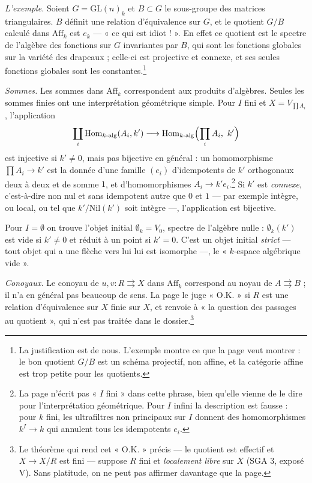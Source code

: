 \documentclass[11pt,a4paper]{article}
\begin{document}
\emph{L'exemple.} Soient $G = \mathrm{GL}(n)_k$ et $B \subset G$ le sous-groupe
des matrices triangulaires. $B$ définit une relation d'équivalence sur $G$, et
le quotient $G/B$ calculé dans $\mathrm{Aff}_k$ est $e_k$ --- « ce qui est
idiot ! ». En effet ce quotient est le spectre de l'algèbre des fonctions sur
$G$ invariantes par $B$, qui sont les fonctions globales sur la variété des
drapeaux ; celle-ci est projective et connexe, et ses seules fonctions globales
sont les constantes.\footnote{La justification est de nous. L'exemple montre ce
que la page veut montrer : le bon quotient $G/B$ est un schéma projectif, non
affine, et la catégorie affine est trop petite pour les quotients.}

\emph{Sommes.} Les sommes dans $\mathrm{Aff}_k$ correspondent aux produits
d'algèbres. Seules les sommes finies ont une interprétation géométrique
simple. Pour $I$ fini et $X = V_{\prod A_i}$, l'application
\[
\coprod_i \operatorname{Hom}_{k\text{-alg}}(A_i, k') \longrightarrow \operatorname{Hom}_{k\text{-alg}}\Bigl(\prod_i A_i,\ k'\Bigr)
\]
est injective si $k' \neq 0$, mais pas bijective en général : un homomorphisme
$\prod A_i \to k'$ est la donnée d'une famille $(e_i)$ d'idempotents de $k'$
orthogonaux deux à deux et de somme $1$, et d'homomorphismes
$A_i \to k' e_i$.\footnote{La page n'écrit pas « $I$ fini » dans cette phrase,
bien qu'elle vienne de le dire pour l'interprétation géométrique. Pour $I$
infini la description est fausse : pour $k$ fini, les ultrafiltres non principaux
sur $I$ donnent des homomorphismes $k^I \to k$ qui annulent tous les
idempotents $e_i$.} Si $k'$ est \emph{connexe}, c'est-à-dire non nul et sans
idempotent autre que $0$ et $1$ --- par exemple intègre, ou local, ou tel que
$k' / \mathrm{Nil}(k')$ soit intègre ---, l'application est bijective.

Pour $I = \emptyset$ on trouve l'objet initial $\emptyset_k = V_0$, spectre de
l'algèbre nulle : $\emptyset_k(k')$ est vide si $k' \neq 0$ et réduit à un point
si $k' = 0$. C'est un objet initial \emph{strict} --- tout objet qui a une flèche
vers lui lui est isomorphe ---, le « $k$-espace algébrique vide ».

\emph{Conoyaux.} Le conoyau de $u, v : R \rightrightarrows X$ dans
$\mathrm{Aff}_k$ correspond au noyau de $A \rightrightarrows B$ ; il n'a en
général pas beaucoup de sens. La page le juge « O.K. » si $R$ est une relation
d'équivalence sur $X$ finie sur $X$, et renvoie à « la question des passages au
quotient », qui n'est pas traitée dans le dossier.\footnote{Le théorème qui rend
cet « O.K. » précis --- le quotient est effectif et $X \to X/R$ est fini ---
suppose $R$ fini et \emph{localement libre} sur $X$ (SGA 3, exposé V). Sans
platitude, on ne peut pas affirmer davantage que la page.}
\end{document}
